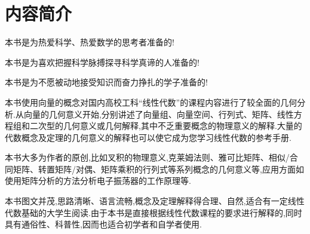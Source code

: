 \chapter*{内容简介}

本书是为热爱科学、热爱数学的思考者准备的!

本书是为喜欢把握科学脉搏探寻科学真谛的人准备的!

本书是为不愿被动地接受知识而奋力挣扎的学子准备的!

本书使用向量的概念对国内高校工科“线性代数”的课程内容进行了较全面的几何分析.从向量的几何意义开始,分别讲述了向量组、向量空间、行列式、矩阵、线性方程组和二次型的几何意义或几何解释,其中不乏重要概念的物理意义的解释.大量的代数概念及定理的几何意义的解释也可以使它成为您学习线性代数的参考手册.

本书大多为作者的原创,比如叉积的物理意义,克莱姆法则、雅可比矩阵、相似/合同矩阵、转置矩阵/对偶、矩阵乘积的行列式等系列概念的几何意义等,应用方面如使用矩阵分析的方法分析电子振荡器的工作原理等.

本书图文并茂,思路清晰、语言流畅,概念及定理解释得合理、自然,适合有一定线性代数基础的大学生阅读.由于本书是直接根据线性代数课程的要求进行解释的,同时具有通俗性、科普性,因而也适合初学者和自学者使用.
